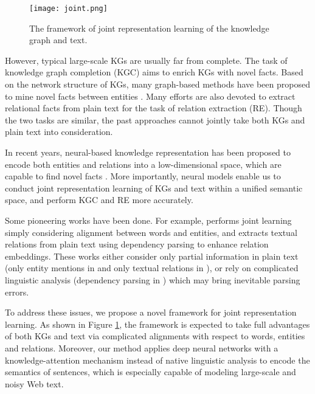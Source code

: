 \documentclass[11pt,a4paper]{article}
\begin{document}
\begin{figure}[]
\centering
\texttt{[image: joint.png]}
\caption{The framework of joint representation learning of the knowledge graph and text.}
\label{fig:joinglearning}
\end{figure}

However, typical large-scale KGs are usually far from complete. The task of knowledge graph completion (KGC) aims to enrich KGs with novel facts. Based on the network structure of KGs, many graph-based methods have been proposed to mine novel facts between entities \cite{lao2011random,lao2010relational}. Many efforts are also devoted to extract relational facts from plain text \cite{surdeanu2012multi,riedel2013relation,min2013distant,zeng2014relation,zeng2015distant,dos2015classifying,lin2016neural} for the task of relation extraction (RE). Though the two tasks are similar, the past approaches cannot jointly take both KGs and plain text into consideration.

In recent years, neural-based knowledge representation has been proposed to encode both entities and relations into a low-dimensional space, which are capable to find novel facts \cite{bordes2013translating,wang2014transh,lin2015learning,ji2015knowledge,he2015learning,xiao2015transg,ji2016knowledge}. More importantly, neural models enable us to conduct joint representation learning of KGs and text within a unified semantic space, and perform KGC and RE more accurately.

Some pioneering works have been done. For example, \cite{wang2014knowledge} performs joint learning simply considering alignment between words and entities, and \cite{toutanova2015representing} extracts textual relations from plain text using dependency parsing to enhance relation embeddings. These works either consider only partial information in plain text (only entity mentions in \cite{wang2014knowledge,xie2016representation,wu2016knowledge,zeng2016incorporating} and only textual relations in \cite{toutanova2015representing}), or rely on complicated linguistic analysis (dependency parsing in \cite{toutanova2015representing}) which may bring inevitable parsing errors.

To address these issues, we propose a novel framework for joint representation learning. As shown in Figure \ref{fig:joinglearning}, the framework is expected to take full advantages of both KGs and text via complicated alignments with respect to words, entities and relations. Moreover, our method applies deep neural networks with a knowledge-attention mechanism instead of native linguistic analysis to encode the semantics of sentences, which is especially capable of modeling large-scale and noisy Web text. 
\end{document}
